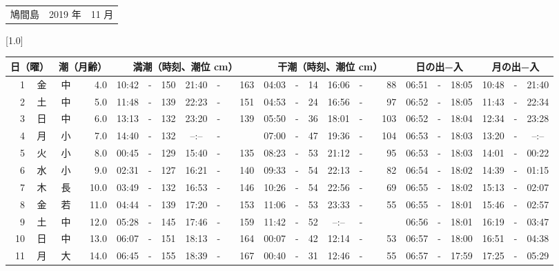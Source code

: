\documentclass[12pt,a4j]{jsarticle}
\begin{document}
 \begin{table}[htbp]
 \begin{center}
 \begin{tabular}{lcc}
 \LARGE{鳩間島}  & \large{2019 年} & \large{11 月} \\
 \end{tabular}
 \end{center}
 \begin{center}
    \scalebox{0.7}[1.0]{
    \begin{tabular}{|rc|cr|ccrccr|ccrccr|ccc|ccc|}
    \hline
    \multicolumn{2}{|c|}{日（曜）} & \multicolumn{2}{c|}{潮（月齢）} & \multicolumn{6}{c|}{満潮（時刻、潮位 cm）} & \multicolumn{6}{c|}{干潮（時刻、潮位 cm）} & \multicolumn{3}{c|}{日の出−入} &  \multicolumn{3}{c|}{月の出−入}\\
 \hline
 1 & 金 & 中 &  4.0 &  10:42 &-& 150 &  21:40 &-& 163 &  04:03 &-&  14 &  16:06 &-&  88 & 06:51 & -& 18:05 & 10:48 & -& 21:40 \\
 2 & 土 & 中 &  5.0 &  11:48 &-& 139 &  22:23 &-& 151 &  04:53 &-&  24 &  16:56 &-&  97 & 06:52 & -& 18:05 & 11:43 & -& 22:34 \\
 3 & 日 & 中 &  6.0 &  13:13 &-& 132 &  23:20 &-& 139 &  05:50 &-&  36 &  18:01 &-& 103 & 06:52 & -& 18:04 & 12:34 & -& 23:28 \\
 4 & 月 & 小 &  7.0 &  14:40 &-& 132 &  --:-- &-&~~~~~ &  07:00 &-&  47 &  19:36 &-& 104 & 06:53 & -& 18:03 & 13:20 & -& --:-- \\
 5 & 火 & 小 &  8.0 &  00:45 &-& 129 &  15:40 &-& 135 &  08:23 &-&  53 &  21:12 &-&  95 & 06:53 & -& 18:03 & 14:01 & -& 00:22 \\
 6 & 水 & 小 &  9.0 &  02:31 &-& 127 &  16:21 &-& 140 &  09:33 &-&  54 &  22:13 &-&  82 & 06:54 & -& 18:02 & 14:39 & -& 01:15 \\
 7 & 木 & 長 & 10.0 &  03:49 &-& 132 &  16:53 &-& 146 &  10:26 &-&  54 &  22:56 &-&  69 & 06:55 & -& 18:02 & 15:13 & -& 02:07 \\
 8 & 金 & 若 & 11.0 &  04:44 &-& 139 &  17:20 &-& 153 &  11:06 &-&  53 &  23:33 &-&  55 & 06:55 & -& 18:01 & 15:46 & -& 02:57 \\
 9 & 土 & 中 & 12.0 &  05:28 &-& 145 &  17:46 &-& 159 &  11:42 &-&  52 &  --:-- &-&~~~~~ & 06:56 & -& 18:01 & 16:19 & -& 03:47 \\
10 & 日 & 中 & 13.0 &  06:07 &-& 151 &  18:13 &-& 164 &  00:07 &-&  42 &  12:14 &-&  53 & 06:57 & -& 18:00 & 16:51 & -& 04:38 \\
11 & 月 & 大 & 14.0 &  06:45 &-& 155 &  18:39 &-& 167 &  00:40 &-&  31 &  12:46 &-&  55 & 06:57 & -& 17:59 & 17:25 & -& 05:29 \\

\end{tabular}}
\end{center}
\end{table}
\end{document}
